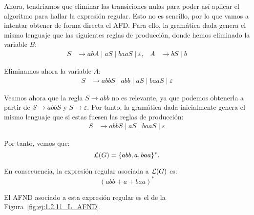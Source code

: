 \begin{ejercicio}
    Ahora, tendríamos que eliminar las transiciones nulas para poder así aplicar el algoritmo para hallar la expresión regular. Esto no es sencillo, por lo que vamos a intentar obtener de forma directa el AFD\@. Para ello, la gramática dada genera el mismo lenguaje que las siguientes reglas de producción, donde hemos eliminado la variable $B$:
    \begin{align*}
        S &\to abA \mid aS \mid baaS \mid \varepsilon, & A &\to bS \mid b
    \end{align*}

    Eliminamos ahora la variable $A$:
    \begin{align*}
        S &\to abbS \mid abb \mid aS \mid baaS \mid \varepsilon
    \end{align*}

    Veamos ahora que la regla $S \to abb$ no es relevante, ya que podemos obtenerla a partir de $S \to abbS$ y $S \to \varepsilon$. Por tanto, la gramática dada inicialmente genera el mismo lenguaje que si estas fuesen las reglas de producción:
    \begin{align*}
        S &\to abbS \mid aS \mid baaS \mid \varepsilon
    \end{align*}

    Por tanto, vemos que:
    \begin{equation*}
        \mathcal{L}(G)=\{abb, a, baa\}^*.
    \end{equation*}

    En consecuencia, la expresión regular asociada a $\mathcal{L}(G)$ es:
    \begin{equation*}
        (abb + a + baa)^*
    \end{equation*}

    El AFND asociado a esta expresión regular es el de la Figura~\ref{fig:ej:1.2.11_L_AFND}.
    \begin{figure}
        \centering
\end{figure}
\end{ejercicio}
